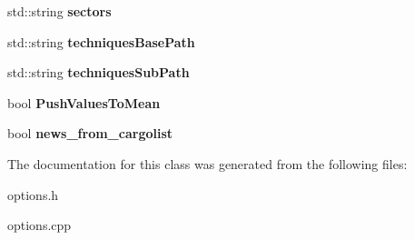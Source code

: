 \begin{DoxyCompactItemize}
\item 
std\+::string {\bfseries sectors}\hypertarget{classvs__options_a0dc305f343eae4b1040bfe00738a374a}{}\label{classvs__options_a0dc305f343eae4b1040bfe00738a374a}

\item 
std\+::string {\bfseries techniques\+Base\+Path}\hypertarget{classvs__options_a2dc0ccae34ca012d4e645d217d5cd53f}{}\label{classvs__options_a2dc0ccae34ca012d4e645d217d5cd53f}

\item 
std\+::string {\bfseries techniques\+Sub\+Path}\hypertarget{classvs__options_af2580db8f6487c74bec4d4efc10c63f7}{}\label{classvs__options_af2580db8f6487c74bec4d4efc10c63f7}

\item 
bool {\bfseries Push\+Values\+To\+Mean}\hypertarget{classvs__options_a8cc2d6c6ad04db966cb4ac4de1b43eab}{}\label{classvs__options_a8cc2d6c6ad04db966cb4ac4de1b43eab}

\item 
bool {\bfseries news\+\_\+from\+\_\+cargolist}\hypertarget{classvs__options_a161d3f9c0c887e5c753990b5defcc8e0}{}\label{classvs__options_a161d3f9c0c887e5c753990b5defcc8e0}

\end{DoxyCompactItemize}


The documentation for this class was generated from the following files\+:\begin{DoxyCompactItemize}
\item 
options.\+h\item 
options.\+cpp\end{DoxyCompactItemize}
